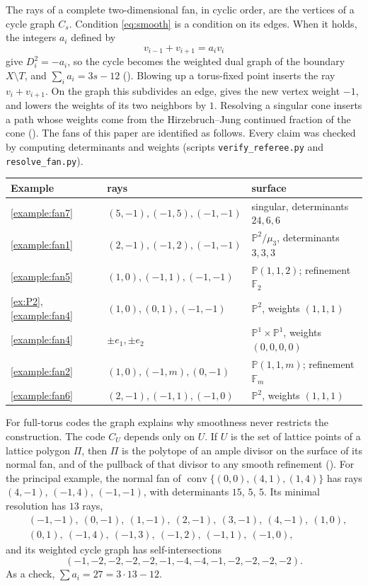\documentclass[12pt,letterpaper]{article}
\numberwithin{equation}{section}
\theoremstyle{definition}
\theoremstyle{remark}
\DeclareMathOperator{\conv}{conv}
\newcommand{\F}{\mathbb{F}}
\newcommand{\PP}{\mathbb{P}}
\begin{document}
The rays of a complete two-dimensional fan, in cyclic order, are the vertices
of a cycle graph $C_s$. Condition \eqref{eq:smooth} is a condition on its
edges. When it holds, the integers $a_i$ defined by
\[
v_{i-1}+v_{i+1}=a_iv_i
\]
give $D_i^2=-a_i$, so the cycle becomes the weighted dual graph of the
boundary $X\setminus T$, and $\sum_ia_i=3s-12$ (\cite[\S2.5]{Fu93}). Blowing
up a torus-fixed point inserts the ray $v_i+v_{i+1}$. On the graph this
subdivides an edge, gives the new vertex weight $-1$, and lowers the weights of
its two neighbors by $1$. Resolving a singular cone inserts a path whose
weights come from the Hirzebruch--Jung continued fraction of the cone
(\cite[\S2.6]{Fu93}). The fans of this paper are identified as follows. Every
claim was checked by computing determinants and weights (scripts
\texttt{verify\_referee.py} and \texttt{resolve\_fan.py}).
\begin{center}
\small
\begin{tabular}{@{}lll@{}}
\toprule
Example & rays & surface\\
\midrule
\ref{example:fan7} & $(5,-1),(-1,5),(-1,-1)$ & singular, determinants $24,6,6$\\
\ref{example:fan1} & $(2,-1),(-1,2),(-1,-1)$ & $\PP^2/\mu_3$, determinants $3,3,3$\\
\ref{example:fan5} & $(1,0),(-1,1),(-1,-1)$ & $\PP(1,1,2)$; refinement $\F_2$\\
\ref{ex:P2}, \ref{example:fan4} & $(1,0),(0,1),(-1,-1)$ & $\PP^2$, weights $(1,1,1)$\\
\ref{example:fan4} & $\pm e_1,\pm e_2$ & $\PP^1\times\PP^1$, weights $(0,0,0,0)$\\
\ref{example:fan2} & $(1,0),(-1,m),(0,-1)$ & $\PP(1,1,m)$; refinement $\F_m$\\
\ref{example:fan6} & $(2,-1),(-1,1),(-1,0)$ & $\PP^2$, weights $(1,1,1)$\\
\bottomrule
\end{tabular}
\end{center}

For full-torus codes the graph explains why smoothness never restricts the
construction. The code $C_U$ depends only on $U$. If $U$ is the set of lattice
points of a lattice polygon $\Pi$, then $\Pi$ is the polytope of an ample
divisor on the surface of its normal fan, and of the pullback of that divisor
to any smooth refinement (\cite[\S3.4]{Fu93}). For the principal example, the
normal fan of $\conv\{(0,0),(4,1),(1,4)\}$ has rays $(4,-1)$, $(-1,4)$,
$(-1,-1)$, with determinants $15$, $5$, $5$. Its minimal resolution has $13$
rays,
\[
\begin{aligned}
&(-1,-1),\ (0,-1),\ (1,-1),\ (2,-1),\ (3,-1),\ (4,-1),\ (1,0),\\
&(0,1),\ (-1,4),\ (-1,3),\ (-1,2),\ (-1,1),\ (-1,0),
\end{aligned}
\]
and its weighted cycle graph has self-intersections
\[
(-1,-2,-2,-2,-2,-1,-4,-4,-1,-2,-2,-2,-2).
\]
As a check, $\sum a_i=27=3\cdot13-12$.
\end{document}
